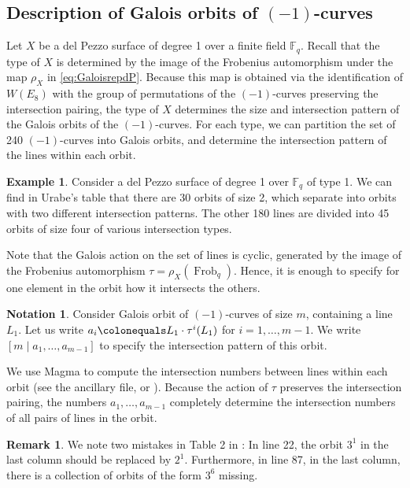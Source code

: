\documentclass[a4paper, 11pt, reqno]{amsart}
\numberwithin{equation}{section} \numberwithin{figure}{section}
\DeclareMathOperator{\Frob}{Frob}
\def \F {{\mathbb F}}
\theoremstyle{definition}
\newtheorem{example}[lemma]{Example}
\newtheorem{remark}[lemma]{Remark}
\newtheorem{notation}[lemma]{Notation}
\numberwithin{lemma}{section}
\begin{document}
\subsection{Description of Galois orbits of $(-1)$-curves}\label{sec:Galoisorbits}

Let $X$ be a del Pezzo surface of degree 1 over a finite field $\F_q$. Recall that the type of $X$ is determined by the image of the Frobenius automorphism under the map $\rho_X$ in \eqref{eq:GaloisrepdP}. Because this map is obtained via the identification of $W(E_8)$ with the group of permutations of the $(-1)$-curves preserving the intersection pairing, the type of $X$ determines the size and intersection pattern of the Galois orbits of the $(-1)$-curves. For each type, we can partition the set of 240 $(-1)$-curves into Galois orbits, and determine the intersection pattern of the lines within each orbit. 

\begin{example}
    Consider a del Pezzo surface of degree 1 over $\F_q$ of type 1. We can find in Urabe's table \cite[Table 2]{urabe2} that there are 30 orbits of size 2, which separate into orbits with two different intersection patterns. The other 180 lines are divided into 45 orbits of size four of various intersection types.
\end{example}

Note that the Galois action on the set of lines is cyclic, generated by the image of the Frobenius automorphism $\tau = \rho_X(\Frob_q)$. Hence, it is enough to specify for one element in the orbit how it intersects the others. 

\begin{notation}\label{not:orbits}
Consider Galois orbit of $(-1)$-curves of size $m$, containing a line $L_1$. Let us write $a_i \colonequals L_1 \cdot \tau^i(L_1)$ for $i = 1, \ldots, m-1$. We write $[m \mid a_1, \ldots, a_{m-1}]$ to specify the intersection pattern of this orbit. 
\end{notation}

We use Magma \cite{magma} to compute the intersection numbers between lines within each orbit (see the ancillary file, or \cite{github_Existence_dP1}). Because the action of $\tau$ preserves the intersection pairing, the numbers $a_1, \ldots, a_{m-1}$ completely determine the intersection numbers of all pairs of lines in the orbit.

\begin{remark}
    We note two mistakes in Table 2 in \cite{urabe2}: In line 22, the orbit $3^1$ in the last column should be replaced by $2^1$. Furthermore, in line 87, in the last column, there is a collection of orbits of the form $3^6$ missing.
\end{remark}
\end{document}
